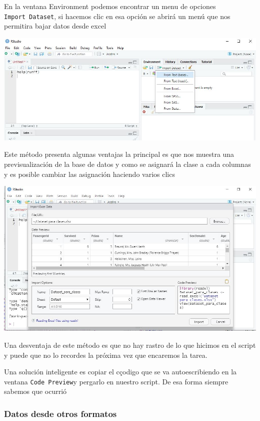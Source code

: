 \documentclass[
]{book}
\begin{document}
En la ventana Environment podemos encontrar un menu de opciones \texttt{Import\ Dataset}, si hacemos clic en esa opción se abrirá un menú que nos permitira bajar datos desde excel

\includegraphics[width=13.72in]{img/Rstudiofig8}

Este método presenta algunas ventajas la principal es que nos muestra una previsualización de la base de datos y como se asignará la clase a cada columnas y es posible cambiar las asignación haciendo varios clics

\includegraphics[width=13.85in]{img/Rstudiofig9}

Una desventaja de este método es que no hay rastro de lo que hicimos en el script y puede que no lo recordes la próxima vez que encaremos la tarea.

Una solución inteligente es copiar el cçodigo que se va autoescribiendo en la ventana \texttt{Code\ Preview}y pergarlo en nuestro script. De esa forma siempre sabemos que ocurrió

\hypertarget{datos-desde-otros-formatos}{%
\subsubsection{Datos desde otros formatos}\label{datos-desde-otros-formatos}}
\end{document}
